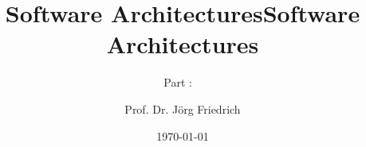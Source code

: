 

\ifoverview
\title[Software Architectures - \partTitle \ (Version \partVersion)]{Software Architectures}

\subtitle[\partTitle]{\partTitle}

\else

\title[Software Architectures - Part \partNo :\ \partTitle \ (Version \partVersion)]{Software Architectures}

\subtitle[Part  \partNo :\  \partTitle]{Part \partNo : \  \partTitle}

\fi

\author[Prof. Dr. Jörg Friedrich]{Prof. Dr. Jörg Friedrich}%


\ifpartII
{}
\fi


\date[\copyright{} 2015]{\today}

\makenoidxglossaries





